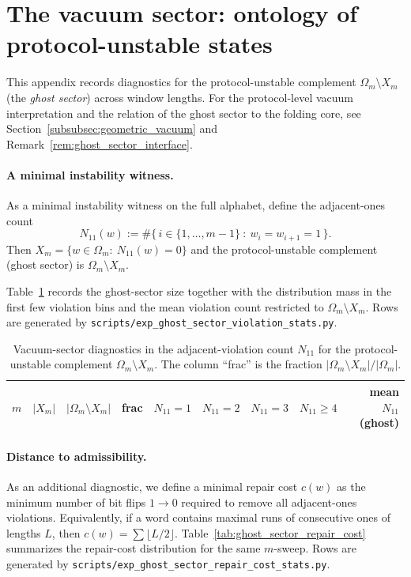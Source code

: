 \section{The vacuum sector: ontology of protocol-unstable states}
\label{app:ghost_sector}

This appendix records diagnostics for the protocol-unstable complement $\Omega_m\setminus X_m$ (the \emph{ghost sector}) across window lengths.
For the protocol-level vacuum interpretation and the relation of the ghost sector to the folding core, see Section~\ref{subsubsec:geometric_vacuum} and Remark~\ref{rem:ghost_sector_interface}.

\paragraph{A minimal instability witness.}
As a minimal instability witness on the full alphabet, define the adjacent-ones count
\[
N_{11}(w):=\#\{\,i\in\{1,\dots,m-1\}\ :\ w_i=w_{i+1}=1\,\}.
\]
Then $X_m=\{w\in\Omega_m:\ N_{11}(w)=0\}$ and the protocol-unstable complement (ghost sector) is $\Omega_m\setminus X_m$.

Table~\ref{tab:ghost_sector_violations} records the ghost-sector size together with the distribution mass in the first few violation bins and the mean violation count restricted to $\Omega_m\setminus X_m$.
Rows are generated by \texttt{scripts/exp\_ghost\_sector\_violation\_stats.py}.

\begin{table}[H]
\centering
\scriptsize
\setlength{\tabcolsep}{6pt}
\renewcommand{\arraystretch}{1.15}
\begin{tabular}{rrrrrrrrr}
\toprule
$m$ & $|X_m|$ & $|\Omega_m\setminus X_m|$ & frac &
$N_{11}=1$ & $N_{11}=2$ & $N_{11}=3$ & $N_{11}\ge 4$ & mean $N_{11}$ (ghost) \\
\midrule
%
\end{tabular}
\caption{Vacuum-sector diagnostics in the adjacent-violation count $N_{11}$ for the protocol-unstable complement $\Omega_m\setminus X_m$. The column ``frac'' is the fraction $|\Omega_m\setminus X_m|/|\Omega_m|$.}
\label{tab:ghost_sector_violations}
\end{table}

\paragraph{Distance to admissibility.}
As an additional diagnostic, we define a minimal repair cost $c(w)$ as the minimum number of bit flips $1\to 0$ required to remove all adjacent-ones violations.
Equivalently, if a word contains maximal runs of consecutive ones of lengths $L$, then $c(w)=\sum \lfloor L/2\rfloor$.
Table~\ref{tab:ghost_sector_repair_cost} summarizes the repair-cost distribution for the same $m$-sweep.
Rows are generated by \texttt{scripts/exp\_ghost\_sector\_repair\_cost\_stats.py}.

